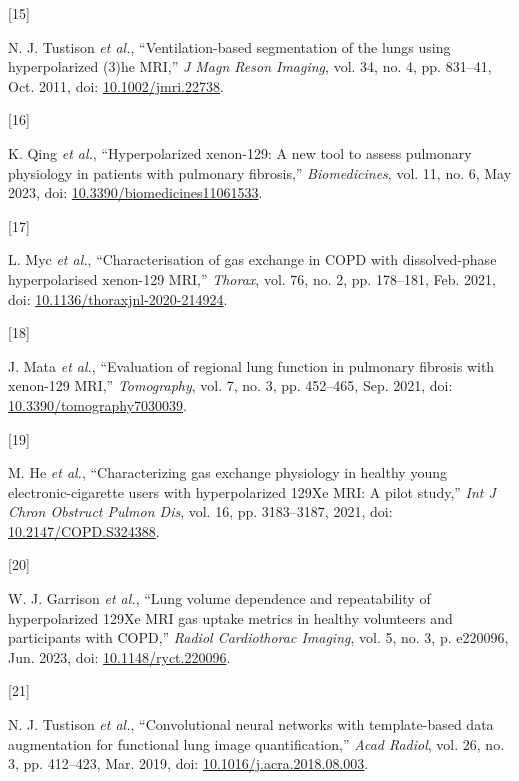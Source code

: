 \documentclass[
  11pt,
]{article}
\newlength{\cslhangindent}
\newlength{\csllabelwidth}
\newenvironment{CSLReferences}[2] %
 {%
  \setlength{\parindent}{0pt}
  \ifodd #1 \everypar{\setlength{\hangindent}{\cslhangindent}}\ignorespaces\fi
  \ifnum #2 > 0
  \setlength{\parskip}{#2\baselineskip}
  \fi
 }%
 {}
\newcommand{\CSLLeftMargin}[1]{\parbox[t]{\csllabelwidth}{#1}}
\newcommand{\CSLRightInline}[1]{\parbox[t]{\linewidth - \csllabelwidth}{#1}\break}
\begin{document}
\begin{CSLReferences}{0}{0}
\leavevmode{}%
\CSLLeftMargin{{[}15{]} }
\CSLRightInline{N. J. Tustison \emph{et al.}, {``Ventilation-based
segmentation of the lungs using hyperpolarized (3)he MRI,''} \emph{J
Magn Reson Imaging}, vol. 34, no. 4, pp. 831--41, Oct. 2011, doi:
\href{https://doi.org/10.1002/jmri.22738}{10.1002/jmri.22738}.}

\leavevmode{}%
\CSLLeftMargin{{[}16{]} }
\CSLRightInline{K. Qing \emph{et al.}, {``Hyperpolarized xenon-129: A
new tool to assess pulmonary physiology in patients with pulmonary
fibrosis,''} \emph{Biomedicines}, vol. 11, no. 6, May 2023, doi:
\href{https://doi.org/10.3390/biomedicines11061533}{10.3390/biomedicines11061533}.}

\leavevmode{}%
\CSLLeftMargin{{[}17{]} }
\CSLRightInline{L. Myc \emph{et al.}, {``Characterisation of gas
exchange in COPD with dissolved-phase hyperpolarised xenon-129 MRI,''}
\emph{Thorax}, vol. 76, no. 2, pp. 178--181, Feb. 2021, doi:
\href{https://doi.org/10.1136/thoraxjnl-2020-214924}{10.1136/thoraxjnl-2020-214924}.}

\leavevmode{}%
\CSLLeftMargin{{[}18{]} }
\CSLRightInline{J. Mata \emph{et al.}, {``Evaluation of regional lung
function in pulmonary fibrosis with xenon-129 MRI,''} \emph{Tomography},
vol. 7, no. 3, pp. 452--465, Sep. 2021, doi:
\href{https://doi.org/10.3390/tomography7030039}{10.3390/tomography7030039}.}

\leavevmode{}%
\CSLLeftMargin{{[}19{]} }
\CSLRightInline{M. He \emph{et al.}, {``Characterizing gas exchange
physiology in healthy young electronic-cigarette users with
hyperpolarized 129Xe MRI: A pilot study,''} \emph{Int J Chron Obstruct
Pulmon Dis}, vol. 16, pp. 3183--3187, 2021, doi:
\href{https://doi.org/10.2147/COPD.S324388}{10.2147/COPD.S324388}.}

\leavevmode{}%
\CSLLeftMargin{{[}20{]} }
\CSLRightInline{W. J. Garrison \emph{et al.}, {``Lung volume dependence
and repeatability of hyperpolarized 129Xe MRI gas uptake metrics in
healthy volunteers and participants with COPD,''} \emph{Radiol
Cardiothorac Imaging}, vol. 5, no. 3, p. e220096, Jun. 2023, doi:
\href{https://doi.org/10.1148/ryct.220096}{10.1148/ryct.220096}.}

\leavevmode{}%
\CSLLeftMargin{{[}21{]} }
\CSLRightInline{N. J. Tustison \emph{et al.}, {``Convolutional neural
networks with template-based data augmentation for functional lung image
quantification,''} \emph{Acad Radiol}, vol. 26, no. 3, pp. 412--423,
Mar. 2019, doi:
\href{https://doi.org/10.1016/j.acra.2018.08.003}{10.1016/j.acra.2018.08.003}.}


\end{CSLReferences}
\end{document}
